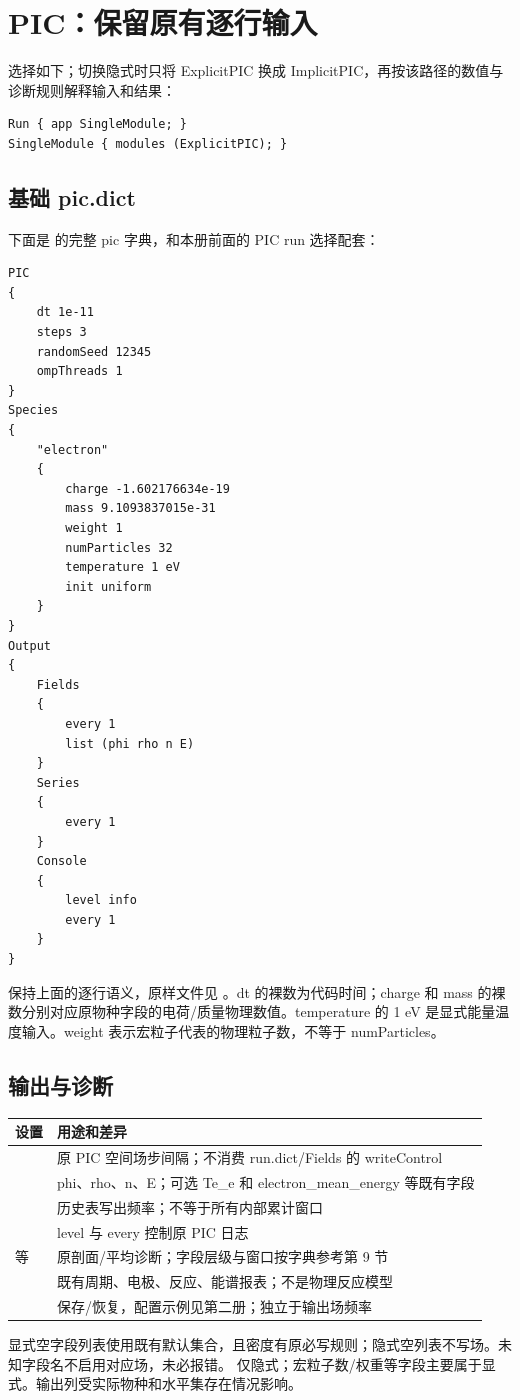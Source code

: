 \documentclass[a4paper,11pt]{article}
\begin{document}
\section{PIC：保留原有逐行输入}
 选择如下；切换隐式时只将 ExplicitPIC 换成 ImplicitPIC，再按该路径的数值与诊断规则解释输入和结果：
\begin{lstlisting}
Run { app SingleModule; }
SingleModule { modules (ExplicitPIC); }
\end{lstlisting}
\subsection{基础 pic.dict}
下面是  的完整 pic 字典，和本册前面的 PIC run 选择配套：
\begin{lstlisting}
PIC
{
    dt 1e-11
    steps 3
    randomSeed 12345
    ompThreads 1
}
Species
{
    "electron"
    {
        charge -1.602176634e-19
        mass 9.1093837015e-31
        weight 1
        numParticles 32
        temperature 1 eV
        init uniform
    }
}
Output
{
    Fields
    {
        every 1
        list (phi rho n E)
    }
    Series
    {
        every 1
    }
    Console
    {
        level info
        every 1
    }
}
\end{lstlisting}
保持上面的逐行语义，原样文件见 。dt 的裸数为代码时间；charge 和 mass 的裸数分别对应原物种字段的电荷/质量物理数值。temperature 的 1 eV 是显式能量温度输入。weight 表示宏粒子代表的物理粒子数，不等于 numParticles。

\subsection{输出与诊断}
\begin{longtable}{L{.30\linewidth}L{.62\linewidth}}
\toprule 设置 & 用途和差异 \\\midrule\endhead
{} & 原 PIC 空间场步间隔；不消费 run.dict/Fields 的 writeControl \\
 & phi、rho、n、E；可选 Te\_e 和 electron\_mean\_energy 等既有字段 \\
 & 历史表写出频率；不等于所有内部累计窗口 \\
 & level 与 every 控制原 PIC 日志 \\
 等 & 原剖面/平均诊断；字段层级与窗口按字典参考第 9 节 \\
 & 既有周期、电极、反应、能谱报表；不是物理反应模型 \\
 & 保存/恢复，配置示例见第二册；独立于输出场频率 \\
\bottomrule
\end{longtable}
显式空字段列表使用既有默认集合，且密度有原必写规则；隐式空列表不写场。未知字段名不启用对应场，未必报错。 仅隐式；宏粒子数/权重等字段主要属于显式。输出列受实际物种和水平集存在情况影响。
\end{document}
